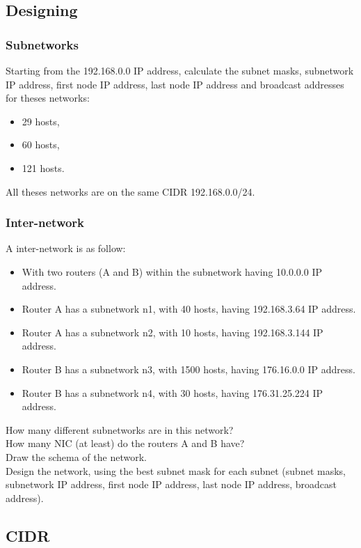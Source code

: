 \documentclass[11pt]{article}
\begin{document}
\subsection{Designing}
\subsubsection{Subnetworks}
Starting from the 192.168.0.0 IP address, calculate the subnet masks, subnetwork IP address, first node IP address, last node IP address and broadcast addresses for theses networks:
\begin{itemize}
  \item 29 hosts,
  \item 60 hosts,
  \item 121 hosts.
\end{itemize}
All theses networks are on the same CIDR 192.168.0.0/24.

\subsubsection{Inter-network}
A inter-network is as follow:
\begin{itemize}
  \item With two routers (A and B) within the subnetwork having 10.0.0.0      IP address.
  \item Router A has a subnetwork n1, with 40 hosts,     having 192.168.3.64  IP address.
  \item Router A has a subnetwork n2, with 10 hosts,     having 192.168.3.144 IP address.
  \item Router B has a subnetwork n3, with 1500 hosts,   having 176.16.0.0    IP address.
  \item Router B has a subnetwork n4, with 30 hosts,     having 176.31.25.224 IP address.
\end{itemize}
How many different subnetworks are in this network?\\
How many NIC (at least) do the routers A and B have?\\
Draw the schema of the network.\\
Design the network, using the best subnet mask for each subnet (subnet masks, subnetwork IP address, first node IP address, last node IP address, broadcast address).

\subsection{CIDR}
\end{document}
